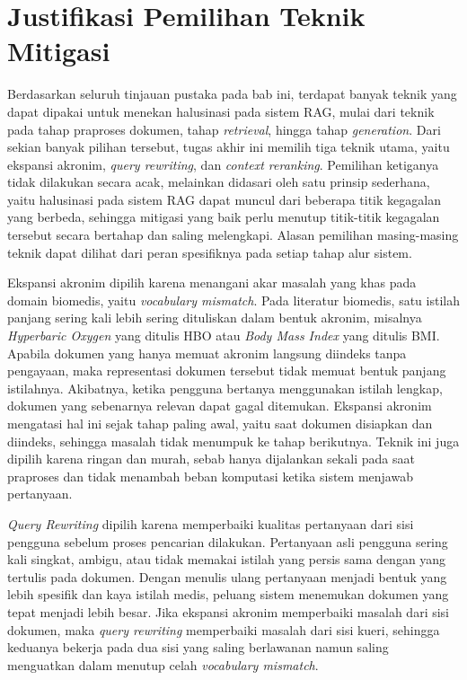 \section{Justifikasi Pemilihan Teknik Mitigasi}
\label{sec:justifikasi-teknik}

Berdasarkan seluruh tinjauan pustaka pada bab ini, terdapat banyak teknik yang dapat dipakai untuk menekan halusinasi pada sistem RAG, mulai dari teknik pada tahap praproses dokumen, tahap \textit{retrieval}, hingga tahap \textit{generation}. Dari sekian banyak pilihan tersebut, tugas akhir ini memilih tiga teknik utama, yaitu ekspansi akronim, \textit{query rewriting}, dan \textit{context reranking}. Pemilihan ketiganya tidak dilakukan secara acak, melainkan didasari oleh satu prinsip sederhana, yaitu halusinasi pada sistem RAG dapat muncul dari beberapa titik kegagalan yang berbeda, sehingga mitigasi yang baik perlu menutup titik-titik kegagalan tersebut secara bertahap dan saling melengkapi. Alasan pemilihan masing-masing teknik dapat dilihat dari peran spesifiknya pada setiap tahap alur sistem.

Ekspansi akronim dipilih karena menangani akar masalah yang khas pada domain biomedis, yaitu \textit{vocabulary mismatch}. Pada literatur biomedis, satu istilah panjang sering kali lebih sering dituliskan dalam bentuk akronim, misalnya \textit{Hyperbaric Oxygen} yang ditulis HBO atau \textit{Body Mass Index} yang ditulis BMI. Apabila dokumen yang hanya memuat akronim langsung diindeks tanpa pengayaan, maka representasi dokumen tersebut tidak memuat bentuk panjang istilahnya. Akibatnya, ketika pengguna bertanya menggunakan istilah lengkap, dokumen yang sebenarnya relevan dapat gagal ditemukan. Ekspansi akronim mengatasi hal ini sejak tahap paling awal, yaitu saat dokumen disiapkan dan diindeks, sehingga masalah tidak menumpuk ke tahap berikutnya. Teknik ini juga dipilih karena ringan dan murah, sebab hanya dijalankan sekali pada saat praproses dan tidak menambah beban komputasi ketika sistem menjawab pertanyaan.

\textit{Query Rewriting} dipilih karena memperbaiki kualitas pertanyaan dari sisi pengguna sebelum proses pencarian dilakukan. Pertanyaan asli pengguna sering kali singkat, ambigu, atau tidak memakai istilah yang persis sama dengan yang tertulis pada dokumen. Dengan menulis ulang pertanyaan menjadi bentuk yang lebih spesifik dan kaya istilah medis, peluang sistem menemukan dokumen yang tepat menjadi lebih besar. Jika ekspansi akronim memperbaiki masalah dari sisi dokumen, maka \textit{query rewriting} memperbaiki masalah dari sisi kueri, sehingga keduanya bekerja pada dua sisi yang saling berlawanan namun saling menguatkan dalam menutup celah \textit{vocabulary mismatch}.

